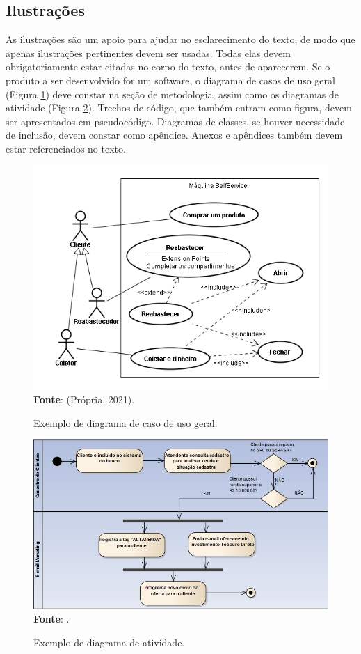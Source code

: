 \subsection{Ilustrações}\label{sec:Ilustracoes}
As ilustrações são um apoio para ajudar no esclarecimento do texto, de modo que apenas ilustrações pertinentes devem ser usadas. Todas elas devem obrigatoriamente estar citadas no corpo do texto, antes de aparecerem. 
Se o produto a ser desenvolvido for um software, o diagrama de casos de uso geral (Figura \ref{fig:CasoDeUso}) deve constar na seção de metodologia, assim como os diagramas de atividade (Figura \ref{fig:Atividades}). Trechos de código, que também entram como figura, devem ser apresentados em pseudocódigo. Diagramas de classes, se houver necessidade de inclusão, devem constar como apêndice. Anexos e apêndices também devem estar referenciados no texto. 

\begin{figure}[htb]
	\centering
	\caption{Exemplo de diagrama de caso de uso geral.}
	\includegraphics[scale=0.6]{imagens/DiagramaCasoDeUso.png} 
	\newline \footnotesize \textbf{Fonte}: (Própria, 2021).
	\label{fig:CasoDeUso}
\end{figure}

\begin{figure}[htb]
	\centering
	\caption{Exemplo de diagrama de atividade.}
	\includegraphics[scale=0.6]{imagens/DiagramaAtividades.png} 
	\newline \footnotesize \textbf{Fonte}: \cite{Ventura2018}.
	\label{fig:Atividades}
\end{figure}
